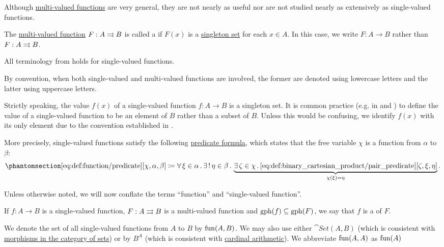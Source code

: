 \begin{definition}\label{def:function}
  Although \hyperref[def:multi_valued_function]{multi-valued functions} are very general, they are not nearly as useful nor are not studied nearly as extensively as single-valued functions.

  The \hyperref[def:multi_valued_function]{multi-valued function} \( F: A \rightrightarrows B \) is called a  if \( F(x) \) is a \hyperref[rem:singleton_sets]{singleton set} for each \( x \in A \). In this case, we write \( F: A \to B \) rather than \( F: A \rightrightarrows B \).

  All terminology from  holds for single-valued functions.

  By convention, when both single-valued and multi-valued functions are involved, the former are denoted using lowercase letters and the latter using uppercase letters.

  Strictly speaking, the value \( f(x) \) of a single-valued function \( f: A \to B \) is a singleton set. It is common practice (e.g. in \cite[def. 3.1]{OpenLogicFull} and \cite[10]{Kelley1955}) to define the value of a single-valued function to be an element of \( B \) rather than a subset of \( B \). Unless this would be confusing, we identify \( f(x) \) with its only element due to the convention established in .

  More precisely, single-valued functions satisfy the following \hyperref[rem:predicate_formula]{predicate formula}, which states that the free variable \( \chi \) is a function from \( \alpha \) to \( \beta \):
  \begin{equation*}\taglabel[\op{IsFun}]{eq:def:function/predicate}
    \ref{eq:def:function/predicate}[\chi, \alpha, \beta] \coloneqq \qforall {\xi \in \alpha} \qExists {\eta \in \beta} \underbrace{ \qexists {\zeta \in \chi} \ref{eq:def:binary_cartesian_product/pair_predicate}[\zeta, \xi, \eta] }_{\chi(\xi) = \eta}.
  \end{equation*}

  Unless otherwise noted, we will now conflate the terms \enquote{function} and \enquote{single-valued function}.

  \begin{thmenum}
     If \( f: A \to B \) is a single-valued function, \( F: A \rightrightarrows B \) is a multi-valued function and \( \operatorname{gph}(f) \subseteq \operatorname{gph}(F) \), we say that \( f \) is a  of \( F \).

     We denote the set of all single-valued functions from \( A \) to \( B \) by \( \operatorname{fun}(A, B) \). We may also use either \( \cat{Set}(A, B) \) (which is consistent with \hyperref[def:category_of_sets]{morphisms in the category of sets}) or by \( B^A \) (which is consistent with \hyperref[def:cardinal_arithmetic]{cardinal arithmetic}). We abbreviate \( \operatorname{fun}(A, A) \) as \( \operatorname{fun}(A) \)
  \end{thmenum}
\end{definition}


